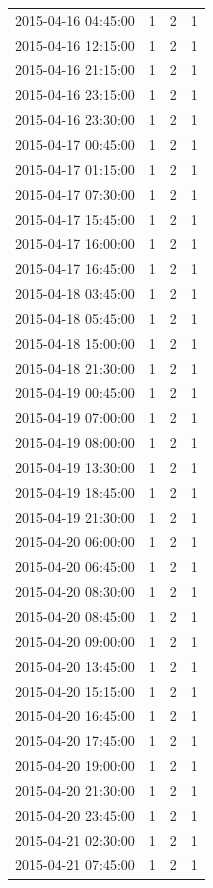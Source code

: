 \begin{tabular}{lrrr}
2015-04-16 04:45:00 & 1 & 2 & 1 \\
2015-04-16 12:15:00 & 1 & 2 & 1 \\
2015-04-16 21:15:00 & 1 & 2 & 1 \\
2015-04-16 23:15:00 & 1 & 2 & 1 \\
2015-04-16 23:30:00 & 1 & 2 & 1 \\
2015-04-17 00:45:00 & 1 & 2 & 1 \\
2015-04-17 01:15:00 & 1 & 2 & 1 \\
2015-04-17 07:30:00 & 1 & 2 & 1 \\
2015-04-17 15:45:00 & 1 & 2 & 1 \\
2015-04-17 16:00:00 & 1 & 2 & 1 \\
2015-04-17 16:45:00 & 1 & 2 & 1 \\
2015-04-18 03:45:00 & 1 & 2 & 1 \\
2015-04-18 05:45:00 & 1 & 2 & 1 \\
2015-04-18 15:00:00 & 1 & 2 & 1 \\
2015-04-18 21:30:00 & 1 & 2 & 1 \\
2015-04-19 00:45:00 & 1 & 2 & 1 \\
2015-04-19 07:00:00 & 1 & 2 & 1 \\
2015-04-19 08:00:00 & 1 & 2 & 1 \\
2015-04-19 13:30:00 & 1 & 2 & 1 \\
2015-04-19 18:45:00 & 1 & 2 & 1 \\
2015-04-19 21:30:00 & 1 & 2 & 1 \\
2015-04-20 06:00:00 & 1 & 2 & 1 \\
2015-04-20 06:45:00 & 1 & 2 & 1 \\
2015-04-20 08:30:00 & 1 & 2 & 1 \\
2015-04-20 08:45:00 & 1 & 2 & 1 \\
2015-04-20 09:00:00 & 1 & 2 & 1 \\
2015-04-20 13:45:00 & 1 & 2 & 1 \\
2015-04-20 15:15:00 & 1 & 2 & 1 \\
2015-04-20 16:45:00 & 1 & 2 & 1 \\
2015-04-20 17:45:00 & 1 & 2 & 1 \\
2015-04-20 19:00:00 & 1 & 2 & 1 \\
2015-04-20 21:30:00 & 1 & 2 & 1 \\
2015-04-20 23:45:00 & 1 & 2 & 1 \\
2015-04-21 02:30:00 & 1 & 2 & 1 \\
2015-04-21 07:45:00 & 1 & 2 & 1 \\

\end{tabular}
